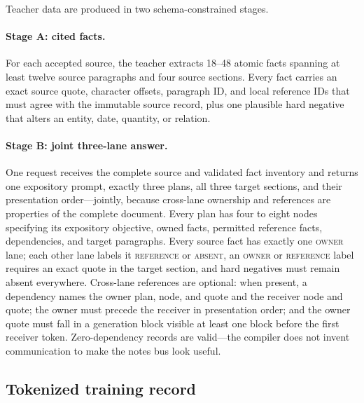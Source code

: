\documentclass[10pt]{article}
\begin{document}
Teacher data are produced in two schema-constrained stages.

\paragraph{Stage A: cited facts.}
For each accepted source, the teacher extracts 18--48 atomic facts spanning
at least twelve source paragraphs and four source sections. Every fact
carries an exact source quote, character offsets, paragraph ID, and local
reference IDs that must agree with the immutable source record, plus one
plausible hard negative that alters an entity, date, quantity, or relation.

\paragraph{Stage B: joint three-lane answer.}
One request receives the complete source and validated fact inventory and
returns one expository prompt, exactly three plans, all three target
sections, and their presentation order---jointly, because cross-lane
ownership and references are properties of the complete document. Every plan
has four to eight nodes specifying its expository objective, owned facts,
permitted reference facts, dependencies, and target paragraphs. Every source
fact has exactly one \textsc{owner} lane; each other lane labels it
\textsc{reference} or \textsc{absent}, an \textsc{owner} or
\textsc{reference} label requires an exact quote in the target section, and
hard negatives must remain absent everywhere. Cross-lane references are
optional: when present, a dependency names the owner plan, node, and quote
and the receiver node and quote; the owner must precede the receiver in
presentation order; and the owner quote must fall in a generation block
visible at least one block before the first receiver token. Zero-dependency
records are valid---the compiler does not invent communication to make the
notes bus look useful.

\subsection{Tokenized training record}
\end{document}
